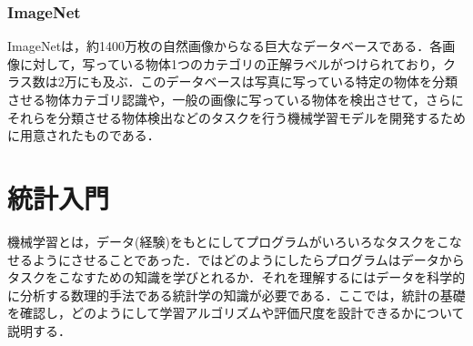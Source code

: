 \documentclass[a4paper,11pt]{jsreport}
\begin{document}
\subsubsection{ImageNet}
ImageNetは，約1400万枚の自然画像からなる巨大なデータベースである．各画像に対して，写っている物体1つのカテゴリの正解ラベルがつけられており，クラス数は2万にも及ぶ．このデータベースは写真に写っている特定の物体を分類させる物体カテゴリ認識や，一般の画像に写っている物体を検出させて，さらにそれらを分類させる物体検出などのタスクを行う機械学習モデルを開発するために用意されたものである．

\section{統計入門}
機械学習とは，データ(経験)をもとにしてプログラムがいろいろなタスクをこなせるようにさせることであった．ではどのようにしたらプログラムはデータからタスクをこなすための知識を学びとれるか．それを理解するにはデータを科学的に分析する数理的手法である統計学の知識が必要である．ここでは，統計の基礎を確認し，どのようにして学習アルゴリズムや評価尺度を設計できるかについて説明する．
\end{document}
